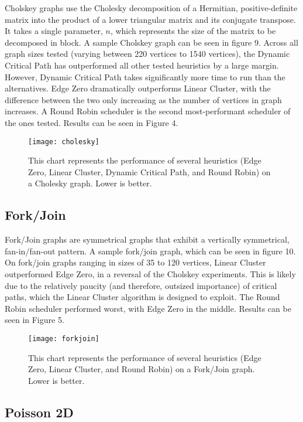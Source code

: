 \documentclass[11pt, oneside]{article}   	%
\begin{document}
Cholskey graphs use the Cholesky decomposition of a Hermitian, positive-definite matrix into the product of a lower triangular matrix and its conjugate transpose. It takes a single parameter, $n$, which represents the size of the matrix to be decomposed in block. A sample Cholskey graph can be seen in figure 9. Across all graph sizes tested (varying between 220 vertices to 1540 vertices), the Dynamic Critical Path has outperformed all other tested heuristics by a large margin. However, Dynamic Critical Path takes significantly more time to run than the alternatives. Edge Zero dramatically outperforms Linear Cluster, with the difference between the two only increasing as the number of vertices in graph increases. A Round Robin scheduler is the second most-performant scheduler of the ones tested. Results can be seen in Figure 4.

\begin{figure}[t]	
\texttt{[image: cholesky]}
\centering
\caption{This chart represents the performance of several heuristics (Edge Zero, Linear Cluster, Dynamic Critical Path, and Round Robin) on a Cholesky graph. Lower is better.}
\end{figure}

\subsection{Fork/Join}
	
Fork/Join graphs are symmetrical graphs that exhibit a vertically symmetrical, fan-in/fan-out pattern. A sample fork/join graph, which can be seen in figure 10. On fork/join graphs ranging in sizes of 35 to 120 vertices, Linear Cluster outperformed Edge Zero, in a reversal of the Cholskey experiments. This is likely due to the relatively paucity (and therefore, outsized importance) of critical paths, which the Linear Cluster algorithm is designed to exploit. The Round Robin scheduler performed worst, with Edge Zero in the middle. Results can be seen in Figure 5.

\begin{figure}[t]
\texttt{[image: forkjoin]}
\centering
\caption{This chart represents the performance of several heuristics (Edge Zero, Linear Cluster, and Round Robin) on a Fork/Join graph. Lower is better.}
\end{figure}

\subsection{Poisson 2D}
\end{document}
